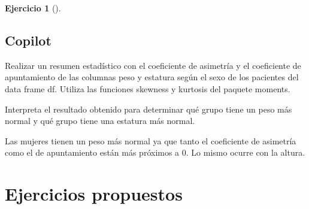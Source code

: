 \documentclass[
  a4paper,
]{scrreport}
\newenvironment{Shaded}{\begin{snugshade}}{\end{snugshade}}
\newcommand{\ExtensionTok}[1]{\textcolor[rgb]{0.00,0.23,0.31}{#1}}
\newcommand{\NormalTok}[1]{\textcolor[rgb]{0.00,0.23,0.31}{#1}}
\theoremstyle{definition}
\newtheorem{exercise}{Ejercicio}[chapter]
\theoremstyle{remark}
\begin{document}
\begin{exercise}[]
\begin{enumerate}
\begin{tcolorbox}
  \section{Copilot}

\begin{Shaded}
\begin{Highlighting}[]
\ExtensionTok{Realizar}\NormalTok{ un resumen estadístico con el coeficiente de asimetría y el coeficiente de apuntamiento de las columnas peso y estatura según el sexo de los pacientes del data frame df. Utiliza las funciones skewness y kurtosis del paquete moments.}

\ExtensionTok{Interpreta}\NormalTok{ el resultado obtenido para determinar qué grupo tiene un peso más normal y qué grupo tiene una estatura más normal.}
\end{Highlighting}
\end{Shaded}

  Las mujeres tienen un peso más normal ya que tanto el coeficiente de
  asimetría como el de apuntamiento están más próximos a 0. Lo mismo
  ocurre con la altura.

  \end{tcolorbox}
\end{enumerate}

\end{exercise}

\section{Ejercicios propuestos}\label{ejercicios-propuestos-3}
\end{document}
